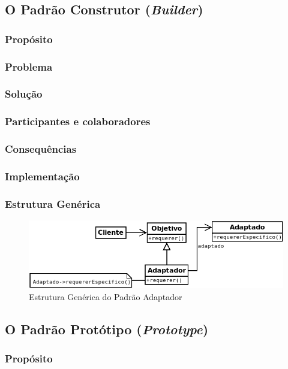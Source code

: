 \subsection{O Padrão Construtor (\textit{Builder})}
\subsubsection{Propósito}
\subsubsection{Problema}
\subsubsection{Solução}
\subsubsection{Participantes e colaboradores}
\subsubsection{Consequências}
\subsubsection{Implementação}
\subsubsection{Estrutura Genérica}

\begin{figure}[h]
\begin{center}
\includegraphics[scale=0.6]{adaptador.png}
\caption{Estrutura Genérica do Padrão Adaptador}\label{fig:adaptador}
\end{center}
\end{figure}

\subsection{O Padrão Protótipo (\textit{Prototype})}
\subsubsection{Propósito}

